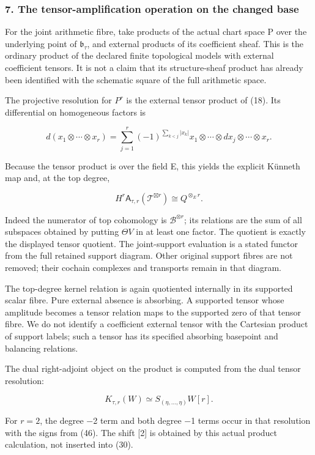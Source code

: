 \subsubsection{7. The tensor-amplification operation on the changed base}\label{endpoint-tau_base--the-tensor-amplification-operation-on-the-changed-base}

For the joint arithmetic fibre, take products of the actual chart space P over the underlying point of \(\mathfrak b_\tau\), and external products of its coefficient sheaf. This is the ordinary product of the declared finite topological models with external coefficient tensors. It is not a claim that its structure-sheaf product has already been identified with the schematic square of the full arithmetic space.

The projective resolution for \(P^r\) is the external tensor product of (18). Its differential on homogeneous factors is

\[
d(x_1\otimes\cdots\otimes x_r)=
\sum_{j=1}^r(-1)^{\sum_{k<j}|x_k|}
 x_1\otimes\cdots\otimes dx_j\otimes\cdots\otimes x_r.
\tag{46}
\]

Because the tensor product is over the field E, this yields the explicit Künneth map and, at the top degree,

\[
\boxed{
H^r\mathsf A_{\tau,r}(\mathcal T^{\boxtimes r})\cong Q^{\otimes_E r}.
}
\tag{47}
\]

Indeed the numerator of top cohomology is \(\mathscr B^{\otimes r}\); its relations are the sum of all subspaces obtained by putting \(\Theta V\) in at least one factor. The quotient is exactly the displayed tensor quotient. The joint-support evaluation is a stated functor from the full retained support diagram. Other original support fibres are not removed; their cochain complexes and transports remain in that diagram.

The top-degree kernel relation is again quotiented internally in its supported scalar fibre. Pure external absence is absorbing. A supported tensor whose amplitude becomes a tensor relation maps to the supported zero of that tensor fibre. We do not identify a coefficient external tensor with the Cartesian product of support labels; such a tensor has its specified absorbing basepoint and balancing relations.

The dual right-adjoint object on the product is computed from the dual tensor resolution:

\[
K_{\tau,r}(W)\simeq S_{(\eta,\ldots,\eta)}W[r].
\tag{48}
\]

For \(r=2\), the degree −2 term and both degree −1 terms occur in that resolution with the signs from (46). The shift {[}2{]} is obtained by this actual product calculation, not inserted into (30).

